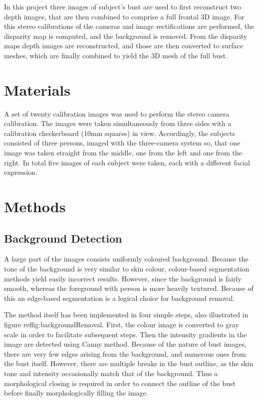 \documentclass[journal]{IEEEtran}
\begin{document}
In this project three images of subject's bust are used to first reconstruct two depth images, that are then combined to comprise a full frontal 3D image.
For this stereo calibrations of the cameras and image rectifications are performed, the disparity map is computed, and the background is removed.
From the disparity maps depth images are reconstructed, and those are then converted to surface meshes, which are finally combined to yield the 3D mesh of the full bust.


\section{Materials}
A set of twenty calibration images was used to perform the stereo camera calibration. 
The images were taken simultaneously from three sides with a calibration checkerboard (10mm squares) in view.
Accordingly, the subjects consisted of three persons, imaged with the three-camera system so, that one image was taken straight from the middle, one from the left and one from the right. 
In total five images of each subject were taken, each with a different facial expression.


\section{Methods}

\subsection{Background Detection}
A large part of the images consists uniformly coloured background.
Because the tone of the background is very similar to skin colour, colour-based segmentation methods yield easily incorrect results. 
However, since the background is fairly smooth, whereas the foreground with person is more heavily textured. 
Because of this an edge-based segmentation is a logical choice for background removal.

The method itself has been implemented in four simple steps, also illustrated in figure ref{fig:backgroundRemoval}.
First, the colour image is converted to gray scale in order to facilitate subsequent steps.
Then the intensity gradients in the image are detected using Canny method.
Because of the nature of bust images, there are very few edges arising from the background, and numerous ones from the bust itself.
However, there are multiple breaks in the bust outline, as the skin tone and intensity occasionally match that of the background. 
Thus a morphological closing is required in order to connect the outline of the bust before finally morphologically filling the image.
\end{document}
